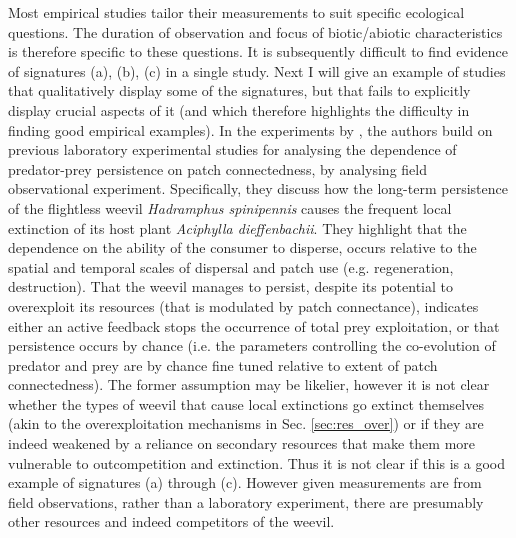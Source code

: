 \documentclass[a4paper]{report}
\begin{document}
Most empirical studies tailor their measurements to suit specific ecological questions. The duration of observation and focus of biotic/abiotic characteristics is therefore specific to these questions. It is subsequently difficult to find evidence of signatures (a), (b), (c) in a single study. Next I will give an example of studies that qualitatively display some of the signatures, but that fails to explicitly display crucial aspects of it (and which therefore highlights the difficulty in finding good empirical examples). In the experiments by \citep{Johst2003}, the authors build on previous laboratory experimental studies for analysing the dependence of predator-prey persistence on patch connectedness, by analysing field observational experiment. Specifically, they discuss how the long-term persistence of the flightless weevil \textit{Hadramphus spinipennis} causes the frequent local extinction of its host plant \textit{Aciphylla dieffenbachii}. They highlight that the dependence on the ability of the consumer to disperse, occurs relative to the spatial and temporal scales of dispersal and patch use (e.g. regeneration, destruction). That the weevil manages to persist, despite its potential to overexploit its resources (that is modulated by patch connectance), indicates either an active feedback stops the occurrence of total prey exploitation, or that persistence occurs by chance (i.e. the parameters controlling the co-evolution of predator and prey are by chance fine tuned relative to extent of patch connectedness). The former assumption may be likelier, however it is not clear whether the types of weevil that cause local extinctions go extinct themselves (akin to the overexploitation mechanisms in Sec. \ref{sec:res_over}) or if they are indeed weakened by a reliance on secondary resources that make them more vulnerable to outcompetition and extinction. Thus it is not clear if this is a good example of signatures (a) through (c). However given measurements are from field observations, rather than a laboratory experiment, there are presumably other resources and indeed competitors of the weevil. \\
\end{document}

